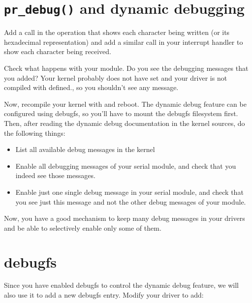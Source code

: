 
\section{{\tt pr\_debug()} and dynamic debugging}

Add a  call in the  operation that shows
each character being written (or its hexadecimal representation) and
add a similar  call in your interrupt handler to show
each character being received.

Check what happens with your module. Do you see the debugging messages
that you added? Your kernel probably does not have
 set and your driver is not compiled with
 defined., so you shouldn't see any message.

Now, recompile your kernel with  and reboot. The
dynamic debug feature can be configured using debugfs, so you'll have
to mount the debugfs filesystem first. Then, after reading the dynamic
debug documentation in the kernel sources, do the following things:

\begin{itemize}

\item List all available debug messages in the kernel

\item Enable all debugging messages of your serial module, and check
  that you indeed see those messages.

\item Enable just one single debug message in your serial module, and
  check that you see just this message and not the other debug
  messages of your module.

\end{itemize}

Now, you have a good mechanism to keep many debug messages in your
drivers and be able to selectively enable only some of them.

\section{debugfs}

Since you have enabled debugfs to control the dynamic debug feature,
we will also use it to add a new debugfs entry. Modify your driver to
add:

